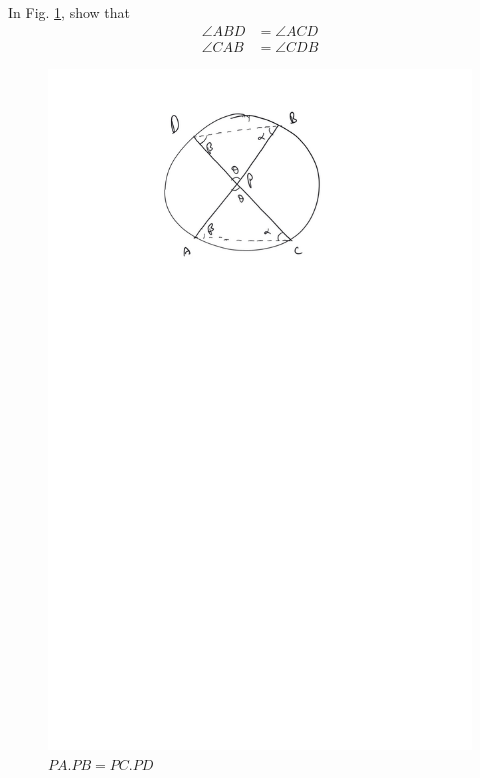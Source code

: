 \begin{problem}
	In Fig. \ref{ch4_chord_product}, show that 
	\begin{equation}
	\begin{split}
\angle ABD &= \angle ACD \\
\angle CAB &= \angle CDB	
	\end{split}
	\end{equation}
\end{problem}
\begin{figure}[!h]
	\begin{center}
		
		\includegraphics[width=\columnwidth]{./figs/ch4_chord_product}
		\vspace*{-10cm}
	\end{center}
	\caption{$PA.PB = PC.PD$}
	\label{ch4_chord_product}	
\end{figure}
